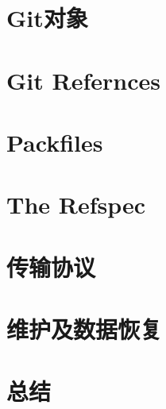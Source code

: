 \documentclass{book}
\begin{document}
	\section{Git对象}
	\section{Git Refernces}
	\section{Packfiles}
	\section{The Refspec}
	\section{传输协议}
	\section{维护及数据恢复}
	\section{总结}
\end{document}

